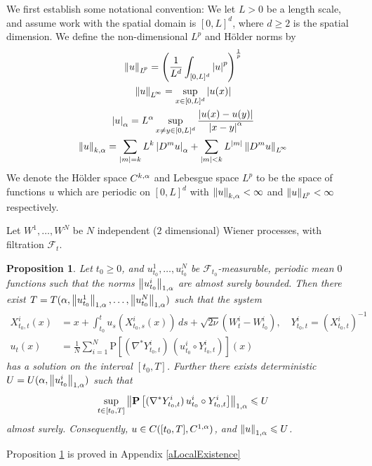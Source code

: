 \documentclass[final]{amsart}%
\newcommand{\lap}{\triangle}
\newcommand{\inv}{^{-1}}
\newcommand{\transpose}{^*}
\newcommand{\grad}{\nabla}
\newcommand{\gradt}{\grad\transpose}
\renewcommand{\leq}{\leqslant}
\renewcommand{\geq}{\geqslant}
\newcommand{\F}{\mathcal{F}}
\newcommand{\lhp}{\boldsymbol{\mathrm{P}}}
\newcommand{\gradperp}{\grad^\perp}
\newcommand{\holderspace}[2]{\ensuremath{C^{\ifx0#1{#2}\else{#1,#2}\fi}}}
\newif\iftextstyle
\newcommand{\abs}[1]{\iftextstyle\lvert#1\rvert\else\left\lvert#1\right\rvert\fi}
\newcommand{\norm}[1]{\iftextstyle\lVert#1\rVert\else\left\lVert#1\right\rVert\fi}
\newcommand{\holdernorm}[3]{\norm{#1}_{\ifx0#2{#3}\else{#2,#3}\fi}}
\newcommand{\holdersnorm}[2]{\abs{#1}_{#2}}
\newcommand{\lpnorm}[2]{\norm{#1}_{\smash{L^{\!#2}_{\vphantom{h}}}\vphantom{L^{\!#2}}}}
\numberwithin{equation}{section}
\newtheorem{proposition}[theorem]{Proposition}
\theoremstyle{definition}
\theoremstyle{remark}
\begin{document}
We first establish some notational convention: We let $L > 0$ be a
length scale, and assume work with the spatial domain is $[0, L]^d$,
where $d\geq 2$ is the spatial dimension. We define the
non-dimensional $L^p$ and H\"older norms by
\begin{gather*}
  \lpnorm{u}{p} = \left( \frac{1}{L^d} \int_{[0,L]^d} \abs{u}^p \right)^{\frac{1}{p}}\\
  \lpnorm{u}{\infty} = \sup_{x \in [0,L]^d} \abs{u (x) }\\
  \holdersnorm{u}{\alpha} = L^\alpha \sup_{x\neq y \in [0,L]^d} \frac{ \abs{u(x) - u(y)} }{ \abs{x - y}^\alpha }\\
  \holdernorm{u}{k}{\alpha} = \sum_{\abs{m} = k} L^k \holdersnorm{D^m
    u}{\alpha} + \sum_{\abs{m} < k} L^{\abs{m}} \lpnorm{D^m u}{\infty}
\end{gather*}
We denote the H\"older space $\holderspace{k}{\alpha}$ and Lebesgue
space $L^p$ to be the space of functions $u$ which are periodic on
$[0,L]^d$ with $\holdernorm{u}{k}{\alpha} < \infty$ and $\lpnorm{u}{p}
< \infty$ respectively.

Let $W^1, \dots, W^N$ be $N$ independent ($2$ dimensional) Wiener
processes, with filtration $\F_t$.
\begin{proposition}\label{pLocalExistence}%
  Let $t_0 \geq 0$, and $u_{t_0}^1, \dots, u_{t_0}^N$ be
  $\F_{t_0}$-measurable, periodic mean $0$ functions such that the
  norms $\holdernorm{u^i_{t_0}}{1}{\alpha}$ are almost surely
  bounded. Then there exist $T = T( \alpha,
  \holdernorm{u_{t_0}^1}{1}{\alpha}, \dots,
  \holdernorm{u_{t_0}^N}{1}{\alpha} )$ such that the system
\begin{align}
  \label{eFlowit0} X^i_{t_0, t}(x) &= x + \int_{t_0}^t u_s( X^i_{t_0,s}(x) )
  \, ds + \sqrt{2\nu} (W^i_t - W^i_{t_0}), \quad   Y^i_{t_0, t} = (X^i_{t_0,t})\inv\\
\label{euNt0} u_t(x) &= \frac{1}{N} \sum_{i=1}^N \lhp\left[ (\gradt Y^i_{t_0, t})
  \, (u^i_{t_0} \circ Y^i_{t_0, t}) \right](x) 
\end{align}
has a solution on the interval $[t_0, T]$. Further there exists deterministic $U =
U(\alpha, \holdernorm{u^i_{t_0}}{1}{\alpha})$ such that
\begin{equation}\label{eUiBound}
  \sup_{t \in [t_0, T]} \holdernorm{\lhp\left[ (\gradt Y^i_{t_0, t})
      \, u^i_{t_0} \circ Y^i_{t_0, t} \right]}{1}{\alpha} \leq U 
\end{equation}
almost surely. Consequently, $u \in C( [t_0, T], \holderspace{1}{\alpha} )$, and $\holdernorm{u}{1}{\alpha} \leq U$.
\end{proposition}%
Proposition \ref{pLocalExistence} is proved in Appendix
\ref{aLocalExistence}
\end{document}
